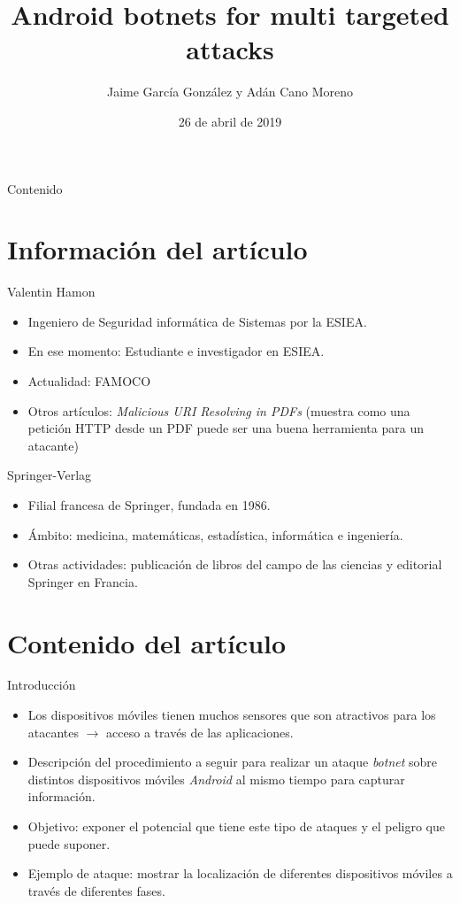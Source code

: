 \documentclass[aspectratio=43]{beamer}
\title{Android botnets for multi targeted attacks}
\author{Jaime García González y Adán Cano Moreno}
\institute{Universidad Carlos III de Madrid}
\date{26 de abril de 2019}
\begin{document}
\maketitle
\begin{frame}{Contenido}
  \tableofcontents
\end{frame}

\section{Información del artículo}
\begin{frame}{Valentin Hamon}
  \begin{itemize}
   \item  Ingeniero de Seguridad informática de Sistemas por la ESIEA.
  \item En ese momento: Estudiante e investigador en ESIEA. 
  \item Actualidad:  FAMOCO
  \item Otros artículos: \emph{Malicious URI Resolving in
PDFs} (muestra como una petición HTTP desde un PDF puede
ser una buena herramienta para un atacante)
  \end{itemize}
\end{frame}
\begin{frame}{Springer-Verlag}
  \begin{itemize}
   \item  Filial francesa
de Springer, fundada en 1986.
  \item Ámbito: medicina, matemáticas, estadística, informática e ingeniería.
  \item Otras actividades:  publicación de libros del campo de las ciencias y editorial Springer en
Francia.

  \end{itemize}
\end{frame}
\section{Contenido del artículo}

\begin{frame}{Introducción}
\begin{itemize}
\item Los dispositivos móviles tienen muchos sensores que son atractivos para
los atacantes $\rightarrow$ acceso a través de las aplicaciones.

\item Descripción del procedimiento a seguir para realizar un ataque \emph{botnet} 
sobre distintos dispositivos móviles \emph{Android} al mismo tiempo para capturar información. 

\item Objetivo: exponer el potencial que tiene este tipo de ataques y el peligro
que puede suponer. 

\item Ejemplo de ataque: mostrar la localización de diferentes dispositivos móviles a través de diferentes fases. 

  \end{itemize}  
\end{frame}
\end{document}
